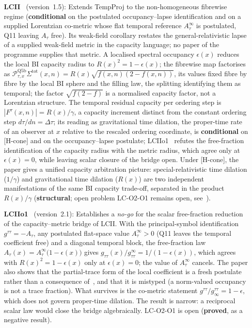 \documentclass[11pt,a4paper]{article}
\newcommand{\sproved}{\textcolor{cproved}{\textbf{proved}}}
\newcommand{\sstruct}{\textcolor{cstruct}{\textbf{structural}}}
\newcommand{\scond}{\textcolor{ccond}{\textbf{conditional}}}
\begin{document}
    \textbf{LCII}~\cite{Beau2026lco2} (version~1.5): Extends TempProj to the non-homogeneous fibrewise regime
    (\scond{} on the postulated occupancy--lapse identification and on a supplied Lorentzian co-metric whose
    flat temporal reference $A_\tau^\infty$ is postulated, Q11 leaving $A_\tau$ free).
    Its weak-field corollary restates the general-relativistic lapse of a supplied weak-field metric in the
    capacity language; no paper of the programme supplies that metric.
    A localised spectral occupancy $\epsilon(x)$ reduces the local BI capacity radius to
    $R(x)^2 = 1-\epsilon(x)$; the fibrewise map factorises as
    $\mathcal{P}_{\tau,x}^{\mathrm{Q5b}}\Sigma^{\mathrm{tot}}(x,n)
    = R(x)\sqrt{f(x,n)(2-f(x,n))}$, its values fixed fibre by fibre by the local BI sphere and the filling law, the
    splitting identifying them as temporal; the factor $\sqrt{f(2-f)}$ is a normalised capacity factor, not a
    Lorentzian structure.
    The temporal residual capacity per ordering step is $|F^\tau(x,n)| = R(x)/\gamma$, a capacity increment distinct
    from the constant ordering step $d\tau/dn = \Delta\tau$; its reading as gravitational time dilation, the
    proper-time rate of an observer at $x$ relative to the rescaled ordering coordinate, is \scond{} on [H-cone] and
    on the occupancy--lapse postulate; LCIIo1~\cite{Beau2026lco2o1}
    refutes the free-fraction identification of the capacity radius with the metric radius, which agree only at
    $\epsilon(x) = 0$, while leaving scalar closure of the bridge open.
    Under [H-cone], the paper gives a unified capacity arbitration picture: special-relativistic time
    dilation ($1/\gamma$) and gravitational time dilation ($R(x)$) are two independent
    manifestations of the same BI capacity trade-off, separated in the product $R(x)/\gamma$
    (\sstruct; open problem LC-O2-O1 remains open, see~\cite{Beau2026lco2o1}).

    \textbf{LCIIo1}~\cite{Beau2026lco2o1} (version~2.1): Establishes a \emph{no-go} for the scalar
    free-fraction reduction of the capacity--metric bridge of LCII.
    With the principal-symbol identification $g^{\tau\tau} = -A_{\tau}$, any postulated flat-space value
    $A_\tau^\infty > 0$ (Q11 leaves the temporal coefficient free) and a diagonal temporal block, the free-fraction
    law $A_{\tau}(x) = A_{\tau}^{\infty}\bigl(1-\epsilon(x)\bigr)$ gives
    $g_{\tau\tau}(x)/g_{\tau\tau}^{\infty} = 1/(1-\epsilon(x))$, which agrees with
    $R(x)^{2} = 1-\epsilon(x)$ only at $\epsilon(x) = 0$; the value of $A_\tau^\infty$ cancels.
    The paper also shows that the partial-trace form of the local coefficient is a fresh postulate
    rather than a consequence of~\cite{Beau2026w1}, and that it is mistyped (a norm-valued
    occupancy is not a trace fraction).
    What survives is the co-metric statement $g^{\tau\tau}/g^{\tau\tau}_{\infty} = 1-\epsilon$,
    which does not govern proper-time dilation.
    The result is narrow: a reciprocal scalar law would close the bridge algebraically.
    LC-O2-O1 is open (\sproved, as a negative result).
\end{document}
